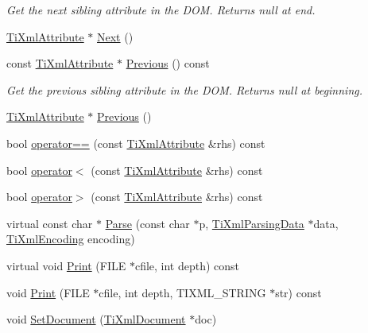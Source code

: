 \begin{DoxyCompactItemize}
\begin{DoxyCompactList}\small\item\em Get the next sibling attribute in the DOM. Returns null at end. \item\end{DoxyCompactList}\item 
\hyperlink{class_ti_xml_attribute}{TiXmlAttribute} $\ast$ \hyperlink{class_ti_xml_attribute_a138320aa7793b148ba7e5bd0a0ea4db6}{Next} ()
\item 
const \hyperlink{class_ti_xml_attribute}{TiXmlAttribute} $\ast$ \hyperlink{class_ti_xml_attribute_a54a5f8730c7b02b9a41b74e12e27fe86}{Previous} () const 
\begin{DoxyCompactList}\small\item\em Get the previous sibling attribute in the DOM. Returns null at beginning. \item\end{DoxyCompactList}\item 
\hyperlink{class_ti_xml_attribute}{TiXmlAttribute} $\ast$ \hyperlink{class_ti_xml_attribute_ae4dabc932cba945ed1e92fec5f121193}{Previous} ()
\item 
bool \hyperlink{class_ti_xml_attribute_ae48c2a65b520d453914ce4e845d607cf}{operator==} (const \hyperlink{class_ti_xml_attribute}{TiXmlAttribute} \&rhs) const 
\item 
bool \hyperlink{class_ti_xml_attribute_adb8b6f2cad5948e73e383182e7ce10de}{operator$<$} (const \hyperlink{class_ti_xml_attribute}{TiXmlAttribute} \&rhs) const 
\item 
bool \hyperlink{class_ti_xml_attribute_a867562769ef9778c1690cd373246b05b}{operator$>$} (const \hyperlink{class_ti_xml_attribute}{TiXmlAttribute} \&rhs) const 
\item 
virtual const char $\ast$ \hyperlink{class_ti_xml_attribute_ad62774421b814894b995af3b5d231dda}{Parse} (const char $\ast$p, \hyperlink{class_ti_xml_parsing_data}{TiXmlParsingData} $\ast$data, \hyperlink{tinyxml_8h_a88d51847a13ee0f4b4d320d03d2c4d96}{TiXmlEncoding} encoding)
\item 
virtual void \hyperlink{class_ti_xml_attribute_acc04956c1d5c4c31fe74f7a7528d109a}{Print} (FILE $\ast$cfile, int depth) const 
\item 
void \hyperlink{class_ti_xml_attribute_a19e6b6862a80b188571c47947e88d030}{Print} (FILE $\ast$cfile, int depth, TIXML\_\-STRING $\ast$str) const 
\item 
void \hyperlink{class_ti_xml_attribute_ac12a94d4548302afb12f488ba101f7d1}{SetDocument} (\hyperlink{class_ti_xml_document}{TiXmlDocument} $\ast$doc)
\end{DoxyCompactItemize}
